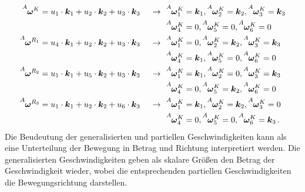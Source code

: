 \begin{align}
\vel{A}{\omega}{K} &= u\idx1 \cdot \bs{k}\idx1 + u\idx2 \cdot \bs{k}\idx2 + u\idx3 \cdot \bs{k}\idx3 &\rArrow &\vel{A}{\omega}{K}\idx1 = \bs{k}\idx1, \vel{A}{\omega}{K}\idx2 = \bs{k}\idx2, \vel{A}{\omega}{K}\idx3 = \bs{k}\idx3 \\
& & &\vel{A}{\omega}{K}\idx4 = 0, \vel{A}{\omega}{K}\idx5 = 0, \vel{A}{\omega}{K}\idx6 = 0 \nonumber
\\
\vel{A}{\omega}{R\idx1} &= u\idx4 \cdot \bs{k}\idx1 + u\idx2 \cdot \bs{k}\idx2 + u\idx3 \cdot \bs{k}\idx3 &\rArrow 
&\vel{A}{\omega}{K}\idx1 = 0, \vel{A}{\omega}{K}\idx2 = \bs{k}\idx2, \vel{A}{\omega}{K}\idx3 = \bs{k}\idx3 \\
& & &\vel{A}{\omega}{K}\idx4 = \bs{k}\idx1, \vel{A}{\omega}{K}\idx5 = 0, \vel{A}{\omega}{K}\idx6 = 0 \nonumber
\\
\vel{A}{\omega}{R\idx2} &= u\idx1 \cdot \bs{k}\idx1 + u\idx5 \cdot \bs{k}\idx2 + u\idx3 \cdot \bs{k}\idx3&\rArrow 
&\vel{A}{\omega}{K}\idx1 = \bs{k}\idx1, \vel{A}{\omega}{K}\idx2 = 0, \vel{A}{\omega}{K}\idx3 = \bs{k}\idx3 \\
& & &\vel{A}{\omega}{K}\idx4 = 0, \vel{A}{\omega}{K}\idx5 = \bs{k}\idx2, \vel{A}{\omega}{K}\idx6 = 0 \nonumber
\\
\vel{A}{\omega}{R\idx3} &= u\idx1 \cdot \bs{k}\idx1 + u\idx2 \cdot \bs{k}\idx2 + u\idx6 \cdot \bs{k}\idx3&\rArrow 
&\vel{A}{\omega}{K}\idx1 = \bs{k}\idx1, \vel{A}{\omega}{K}\idx2 = \bs{k}\idx2, \vel{A}{\omega}{K}\idx3 = 0 \\
& & &\vel{A}{\omega}{K}\idx4 = 0, \vel{A}{\omega}{K}\idx5 = 0, \vel{A}{\omega}{K}\idx6 = \bs{k}\idx3 \nonumber \,.
\end{align}
Die Beudeutung der generalisierten und partiellen Geschwindigkeiten kann als eine Unterteilung der Bewegung in Betrag und Richtung interpretiert werden. Die generalisierten Geschwindigkeiten geben als skalare Größen den Betrag der Geschwindigkeit wieder, wobei die entsprechenden partiellen Geschwindigkeiten die Bewegungsrichtung darstellen.
